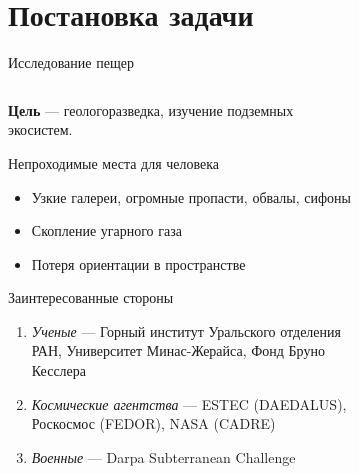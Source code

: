 \section{Постановка задачи}

\begin{frame}[t]{Исследование пещер}


    \begin{columns}[T,onlytextwidth]
        \begin{column}{0.59\textwidth}
            \small
                \textbf{Цель} --- геологоразведка, изучение подземных экосистем.
            \begin{exampleblock}{Непроходимые места для человека}
                \begin{itemize}
                    \item Узкие галереи, огромные пропасти, обвалы, сифоны
                    \item Скопление угарного газа
                    \item Потеря ориентации в пространстве
                \end{itemize}
            \end{exampleblock}
            \vspace{-0.2cm}
            \begin{alertblock}{Заинтересованные стороны}
                \begin{enumerate}
                    \item \textit{Ученые} --- Горный институт Уральского отделения РАН, Университет Минас-Жерайса, Фонд Бруно Кесслера
                    \item \textit{Космические агентства} --- ESTEC (DAEDALUS), Роскосмос (FEDOR), NASA (CADRE)
                    \item \textit{Военные} --- Darpa Subterranean Challenge
                \end{enumerate}
            \end{alertblock}
        \end{column}
        \begin{column}{0.39\textwidth}
            \begin{figure}[H]
                \begin{subfigure}{0.49\textwidth}
                    \centering\includegraphics[height=2cm,width=1\textwidth,keepaspectratio]{../images/slides/rip.jpg}

\end{subfigure}
\end{figure}
\end{column}
\end{columns}
\end{frame}
